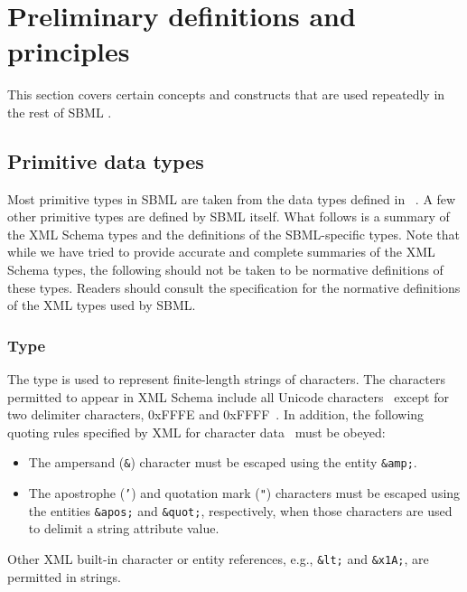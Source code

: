 
\section{Preliminary definitions and principles}
\label{sec:general}

This section covers certain concepts and constructs that are used
repeatedly in the rest of SBML \thisL.


\subsection{Primitive data types}
\label{sec:primitive-types}

Most primitive types in SBML are taken from the data types defined
in \xmlschemaone~\citep{biron:2000,fallside:2000,thompson:2000}.
A few other primitive types are defined by SBML itself.  What
follows is a summary of the XML Schema types and the definitions
of the SBML-specific types.  Note that while we have tried to
provide accurate and complete summaries of the XML Schema types,
the following should not be taken to be normative definitions of
these types.  Readers should consult the \xmlschemaone
specification for the normative definitions of the XML types used
by SBML.


\subsubsection{Type }
\label{sec:string}

The \xmlschemaone type  is used to represent
finite-length strings of characters.  The characters permitted to
appear in XML Schema  include all Unicode
characters~\citep{unicode:1996} except for two delimiter
characters, 0xFFFE and 0xFFFF~\citep{biron:2000}.  In addition,
the following quoting rules specified by XML for character
data~\citep{bray:2000} must be obeyed:
\begin{itemize}

\item The ampersand (\texttt{\&}) character must be escaped using
  the entity \texttt{\&amp;}.

\item The apostrophe (\texttt{'}) and quotation mark (\texttt{"})
  characters must be escaped using the entities \texttt{\&apos;}
  and \texttt{\&quot;}, respectively, when those characters are
  used to delimit a string attribute value.

\end{itemize}
Other XML built-in character or entity references, e.g.,
\texttt{\&lt;} and \texttt{\&x1A;}, are permitted in strings.


